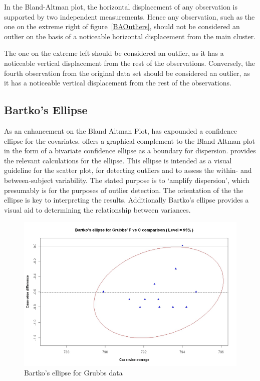 \documentclass[12pt, a4paper]{report}
\theoremstyle{plain}
\theoremstyle{definition}
\theoremstyle{remark}
\begin{document}
In the Bland-Altman plot, the horizontal displacement of any observation is supported by two independent measurements. Hence any observation, such as the one on the extreme right of figure~\ref{BAOutliers}, should not be considered an outlier on the basis of a noticeable horizontal displacement from the main cluster. 

The one	on the extreme left should be considered an outlier, as it has a noticeable vertical displacement from the rest of the observations. Conversely, the fourth observation from the original data set should be considered an outlier, as it has a noticeable vertical displacement from the rest of the observations.

\subsection{Bartko's Ellipse}

As an enhancement on the Bland Altman Plot, \citet{Bartko} has
expounded a confidence ellipse for the covariates. \citet{Bartko} offers a graphical complement to the Bland-Altman
plot in the form of a bivariate confidence ellipse as a boundary for dispersion. \citet{AltmanEllipse} provides the relevant calculations for the ellipse. This ellipse is intended as a visual
guideline for the scatter plot, for detecting outliers and to
assess the within- and between-subject variability. The stated purpose is to `amplify dispersion', which presumably is for the purposes of outlier detection. The orientation of the the ellipse is key to interpreting the results.
Additionally Bartko's ellipse provides a visual aid to determining the
relationship between variances. 



\begin{figure}[h!]
	\includegraphics[width=130mm]{images/GrubbsBartko.jpeg}
	\caption{Bartko's ellipse for Grubbs data}\label{GrubbsBartko}
\end{figure}
\end{document}
